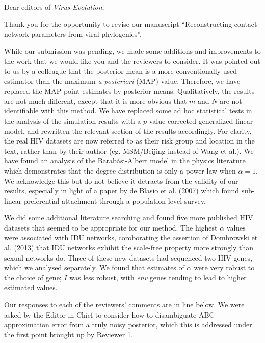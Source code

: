 \documentclass[12pt]{letter}
\begin{document}
\begin{letter}{ }

\opening{Dear editors of \textit{Virus Evolution},}

Thank you for the opportunity to revise our manuscript ``Reconstructing contact
network parameters from viral phylogenies''.

While our submission was pending, we made some additions and improvements to
the work that we would like you and the reviewers to consider. It was pointed
out to us by a colleague that the posterior mean is a more conventionally used
estimator than the maximum \textit{a posteriori} (MAP) value. Therefore, we
have replaced the MAP point estimates by posterior means. Qualitatively, the
results are not much different, except that it is more obvious that $m$ and $N$
are not identifiable with this method. We have replaced some ad hoc statistical
tests in the analysis of the simulation results with a $p$-value corrected
generalized linear model, and rewritten the relevant section of the results
accordingly. For clarity, the real HIV datasets are now referred to as their
risk group and location in the text, rather than by their author (eg.
MSM/Beijing instead of Wang et al.). We have found an analysis of the
Barab\'asi-Albert model in the physics literature which demonstrates that the
degree distribution is only a power law when $\alpha = 1$. We acknowledge this
but do not believe it detracts from the validity of our results, especially in
light of a paper by de Blasio et al. (2007) which found sub-linear preferential
attachment through a population-level survey.

We did some additional literature searching and found five more published HIV
datasets that seemed to be appropriate for our method. The highest $\alpha$
values were associated with IDU networks, coroborating the assertion of
Dombrowski et al. (2013) that IDU networks exhibit the scale-free property more
strongly than sexual networks do. Three of these new datasets had sequenced two
HIV genes, which we analysed separately. We found that estimates of $\alpha$
were very robust to the choice of gene; $I$ was less robust, with \textit{env}
genes tending to lead to higher estimated values.

Our responses to each of the reviewers' comments are in line below. We were
asked by the Editor in Chief to consider how to disambiguate ABC approximation
error from a truly noisy posterior, which this is addressed under the first
point brought up by Reviewer 1.


\end{letter}
\end{document}

